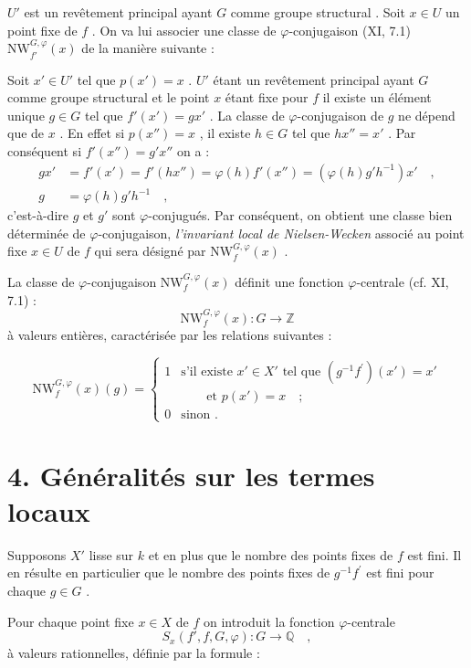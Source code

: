 \documentclass[11pt]{article}
\providecommand{\bZ}{\mathbb Z}
\providecommand{\bQ}{\mathbb Q}
\begin{document}
$U'$ est un revêtement principal ayant $G$ comme groupe structural . Soit $x \in U$ un point fixe de $f$ . On va lui associer une classe de $\varphi$-conjugaison (XI, 7.1) $\mathrm{NW}_{f'}^{G,\varphi}(x)$ de la manière suivante :

Soit $x' \in U'$ tel que $p(x') = x$ . $U'$ étant un revêtement principal ayant $G$ comme groupe structural et le point $x$ étant fixe pour $f$ il existe un élément unique $g \in G$ tel que $f'(x') = gx'$ . La classe de $\varphi$-conjugaison de $g$ ne dépend que de $x$ . En effet si $p(x'') = x$ , il existe $h \in G$ tel que $hx'' = x'$ . Par conséquent si $f'(x'') = g'x''$ on a :
\begin{align*}
gx' &= f'(x') = f'(hx'') = \varphi(h)f'(x'') = (\varphi(h)g'h^{-1})x' \quad , \\
g &= \varphi(h)g'h^{-1} \quad ,
\end{align*}
c'est-à-dire $g$ et $g'$ sont $\varphi$-conjugués. Par conséquent, on obtient une classe bien déterminée de $\varphi$-conjugaison, \emph{l'invariant local de Nielsen-Wecken} associé au point fixe $x \in U$ de $f$ qui sera désigné par $\mathrm{NW}_{f}^{G,\varphi}(x)$ .

La classe de $\varphi$-conjugaison $\mathrm{NW}_{f}^{G,\varphi}(x)$ définit une fonction $\varphi$-centrale (cf. XI, 7.1) :
\[
\mathrm{NW}_{f}^{G,\varphi}(x) : G \longrightarrow \bZ
\]
à valeurs entières, caractérisée par les relations suivantes :

\begin{equation}\tag{3.1}
\mathrm{NW}_{f}^{G,\varphi}(x)(g) = \begin{cases} 1 & \text{s'il existe } x' \in X' \text{ tel que } (g^{-1}f^{\prime})(x') = x' \\ & \qquad \text{et } p(x') = x \quad ; \\ 0 & \text{sinon .} \end{cases}
\end{equation}

\section*{4. Généralités sur les termes locaux}

Supposons $X'$ lisse sur $k$ et en plus que le nombre des points fixes de $f$ est fini. Il en résulte en particulier que le nombre des points fixes de $g^{-1}f^{\prime}$ est fini pour chaque $g \in G$ .

Pour chaque point fixe $x \in X$ de $f$ on introduit la fonction $\varphi$-centrale
\[
S_x(f',f,G,\varphi) : G \longrightarrow \bQ \quad ,
\]
à valeurs rationnelles, définie par la formule :
\end{document}
